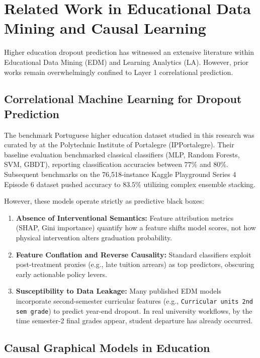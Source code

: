 \section{Related Work in Educational Data Mining and Causal Learning}
\label{sec:bg_related_work}

Higher education dropout prediction has witnessed an extensive literature within Educational Data Mining (EDM) and Learning Analytics (LA). However, prior works remain overwhelmingly confined to Layer 1 correlational prediction.

\subsection{Correlational Machine Learning for Dropout Prediction}

The benchmark Portuguese higher education dataset studied in this research was curated by \textcite{martins2021predicting} at the Polytechnic Institute of Portalegre (IPPortalegre). Their baseline evaluation benchmarked classical classifiers (MLP, Random Forests, SVM, GBDT), reporting classification accuracies between $77\%$ and $80\%$. Subsequent benchmarks on the 76,518-instance Kaggle Playground Series 4 Episode 6 dataset \parencite{kaggle2024s4e6} pushed accuracy to $83.5\%$ utilizing complex ensemble stacking. 

However, these models operate strictly as predictive black boxes:
\begin{enumerate}
    \item \textbf{Absence of Interventional Semantics:} Feature attribution metrics (SHAP, Gini importance) quantify how a feature shifts model scores, not how physical intervention alters graduation probability.
    \item \textbf{Feature Conflation and Reverse Causality:} Standard classifiers exploit post-treatment proxies (e.g., late tuition arrears) as top predictors, obscuring early actionable policy levers.
    \item \textbf{Susceptibility to Data Leakage:} Many published EDM models incorporate second-semester curricular features (e.g., \texttt{Curricular units 2nd sem grade}) to predict year-end dropout. In real university workflows, by the time semester-2 final grades appear, student departure has already occurred.
\end{enumerate}

\subsection{Causal Graphical Models in Education}

